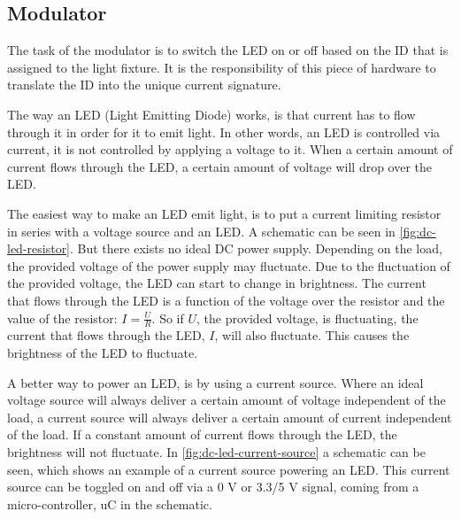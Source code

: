 
\subsection{Modulator}

	The task of the modulator is to switch the LED on or off based on the ID that is assigned to the light fixture.
	It is the responsibility of this piece of hardware to translate the ID into the unique current signature.


	The way an LED (Light Emitting Diode) works, is that current has to flow through it in order for it to emit light.
	In other words, an LED is controlled via current, it is not controlled by applying a voltage to it.
	When a certain amount of current flows through the LED, a certain amount of voltage will drop over the LED.

	The easiest way to make an LED emit light, is to put a current limiting resistor in series with a voltage source and an LED.
	A schematic can be seen in \autoref{fig:dc-led-resistor}.
	But there exists no ideal DC power supply.
	Depending on the load, the provided voltage of the power supply may fluctuate.
	Due to the fluctuation of the provided voltage, the LED can start to change in brightness.
	The current that flows through the LED is a function of the voltage over the resistor and the value of the resistor: $I = \frac{U}{R}$.
	So if $U$, the provided voltage, is fluctuating, the current that flows through the LED, $I$, will also fluctuate.
	This causes the brightness of the LED to fluctuate.


	A better way to power an LED, is by using a current source.
	Where an ideal voltage source will always deliver a certain amount of voltage independent of the load, a current source will always deliver a certain amount of current independent of the load.
	If a constant amount of current flows through the LED, the brightness will not fluctuate.
	In \autoref{fig:dc-led-current-source} a schematic can be seen, which shows an example of a current source powering an LED.
	This current source can be toggled on and off via a 0 V or 3.3/5 V signal, coming from a micro-controller, uC in the schematic.



